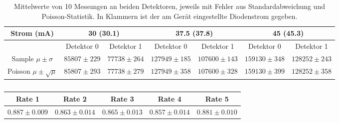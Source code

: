 \begin{table}[H]
	\renewcommand{\arraystretch}{1.5}
	\centering
	\Large
	\begin{adjustbox}{width=1\textwidth}
		\begin{tabular}{c|cc|cc|cc}
		
			Strom (mA) & \multicolumn{2}{c|}{30 (30.1)} & \multicolumn{2}{c|}{37.5 (37.8)} & \multicolumn{2}{c}{45 (45.3)}
			\\
			\hline
			 & Detektor 0 & Detektor 1 & Detektor 0 & Detektor 1 & Detektor 0 & Detektor 1
			\\
			Sample $\mu \pm \sigma$ & $85807 \pm 229$ & $77738 \pm 264$ & $127949 \pm 185$ & $107600 \pm 143$ & $159130 \pm 348$ & $128252 \pm 243$ 
			\\
			Poisson $\mu \pm \sqrt{\mu}$ & $85807 \pm 293$ & $77738 \pm 279$ & $127949 \pm 358$ & $107600 \pm 328$ & $159130 \pm 399$ & $128252 \pm 358$ \\
			
		\end{tabular}
	\end{adjustbox}
	\caption{Mittelwerte von 10 Messungen an beiden Detektoren, jeweils mit Fehler aus Standardabweichung und Poisson-Statistik. In Klammern ist der am Gerät eingestellte Diodenstrom gegeben.}
	\label{tab:}
\end{table}

\begin{table}[H]
	\renewcommand{\arraystretch}{1}
	\centering
	\Large
	\begin{adjustbox}{width=\textwidth}
		\begin{tabular}{|c|c|c|c|c|}
			\hline
			Rate 1 & Rate 2 & Rate 3 & Rate 4 & Rate 5 \\
			\hline
			$0.887 \pm 0.009$ & $0.863 \pm 0.014$ & $0.865 \pm 0.013$ & $0.857 \pm 0.014$ & $0.881 \pm 0.010$ \\
			\hline
		\end{tabular}
	\end{adjustbox}
	\caption{ }
	\label{tab: }
\end{table}





